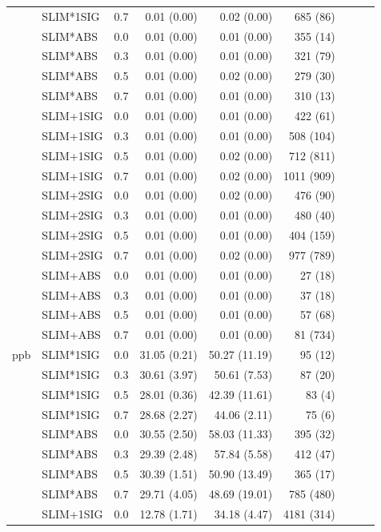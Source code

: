 \begin{longtable}{lllrrrrrr}
 & SLIM*1SIG & 0.7 & 0.01 (0.00) & 0.02 (0.00) & 685 (86) \\
 & SLIM*ABS & 0.0 & 0.01 (0.00) & 0.01 (0.00) & 355 (14) \\
 & SLIM*ABS & 0.3 & 0.01 (0.00) & 0.01 (0.00) & 321 (79) \\
 & SLIM*ABS & 0.5 & 0.01 (0.00) & 0.02 (0.00) & 279 (30) \\
 & SLIM*ABS & 0.7 & 0.01 (0.00) & 0.01 (0.00) & 310 (13) \\
 & SLIM+1SIG & 0.0 & 0.01 (0.00) & 0.01 (0.00) & 422 (61) \\
 & SLIM+1SIG & 0.3 & 0.01 (0.00) & 0.01 (0.00) & 508 (104) \\
 & SLIM+1SIG & 0.5 & 0.01 (0.00) & 0.02 (0.00) & 712 (811) \\
 & SLIM+1SIG & 0.7 & 0.01 (0.00) & 0.02 (0.00) & 1011 (909) \\
 & SLIM+2SIG & 0.0 & 0.01 (0.00) & 0.02 (0.00) & 476 (90) \\
 & SLIM+2SIG & 0.3 & 0.01 (0.00) & 0.01 (0.00) & 480 (40) \\
 & SLIM+2SIG & 0.5 & 0.01 (0.00) & 0.01 (0.00) & 404 (159) \\
 & SLIM+2SIG & 0.7 & 0.01 (0.00) & 0.02 (0.00) & 977 (789) \\
 & SLIM+ABS & 0.0 & 0.01 (0.00) & 0.01 (0.00) & 27 (18) \\
 & SLIM+ABS & 0.3 & 0.01 (0.00) & 0.01 (0.00) & 37 (18) \\
 & SLIM+ABS & 0.5 & 0.01 (0.00) & 0.01 (0.00) & 57 (68) \\
 & SLIM+ABS & 0.7 & 0.01 (0.00) & 0.01 (0.00) & 81 (734) \\
\midrule
ppb & SLIM*1SIG & 0.0 & 31.05 (0.21) & 50.27 (11.19) & 95 (12) \\
 & SLIM*1SIG & 0.3 & 30.61 (3.97) & 50.61 (7.53) & 87 (20) \\
 & SLIM*1SIG & 0.5 & 28.01 (0.36) & 42.39 (11.61) & 83 (4) \\
 & SLIM*1SIG & 0.7 & 28.68 (2.27) & 44.06 (2.11) & 75 (6) \\
 & SLIM*ABS & 0.0 & 30.55 (2.50) & 58.03 (11.33) & 395 (32) \\
 & SLIM*ABS & 0.3 & 29.39 (2.48) & 57.84 (5.58) & 412 (47) \\
 & SLIM*ABS & 0.5 & 30.39 (1.51) & 50.90 (13.49) & 365 (17) \\
 & SLIM*ABS & 0.7 & 29.71 (4.05) & 48.69 (19.01) & 785 (480) \\
 & SLIM+1SIG & 0.0 & 12.78 (1.71) & 34.18 (4.47) & 4181 (314) \\

\end{longtable}
